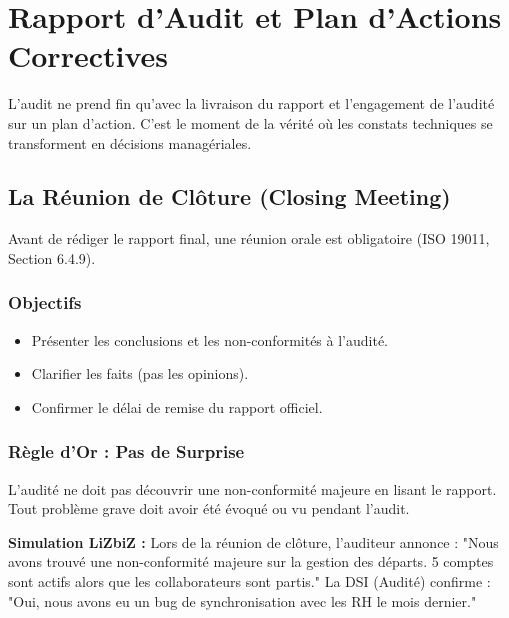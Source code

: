 \chapter{Rapport d'Audit et Plan d'Actions Correctives}
\label{chap:rapportaudit}

L'audit ne prend fin qu'avec la livraison du rapport et l'engagement de l'audité sur un plan d'action. C'est le moment de la vérité où les constats techniques se transforment en décisions managériales.

\section{La Réunion de Clôture (Closing Meeting)}

Avant de rédiger le rapport final, une réunion orale est obligatoire (ISO 19011, Section 6.4.9).

\subsection{Objectifs}

\begin{itemize}
    \item Présenter les conclusions et les non-conformités à l'audité.
    \item Clarifier les faits (pas les opinions).
    \item Confirmer le délai de remise du rapport officiel.
\end{itemize}

\subsection{Règle d'Or : Pas de Surprise}

L'audité ne doit pas découvrir une non-conformité majeure en lisant le rapport. Tout problème grave doit avoir été évoqué ou vu pendant l'audit.

\begin{boxlizbiz}
\textbf{Simulation LiZbiZ :}
Lors de la réunion de clôture, l'auditeur annonce : "Nous avons trouvé une non-conformité majeure sur la gestion des départs. 5 comptes sont actifs alors que les collaborateurs sont partis."
La DSI (Audité) confirme : "Oui, nous avons eu un bug de synchronisation avec les RH le mois dernier."
\end{boxlizbiz}

